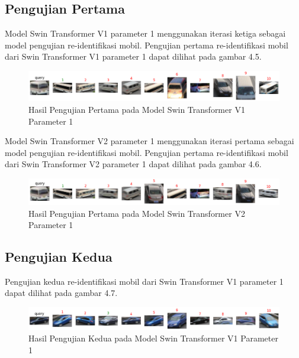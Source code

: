 \subsection{Pengujian Pertama}

Model Swin Transformer V1 parameter 1 menggunakan iterasi ketiga sebagai model pengujian re-identifikasi mobil. Pengujian pertama
re-identifikasi mobil dari Swin Transformer V1 parameter 1 dapat dilihat pada gambar 4.5.

\begin{figure}[ht]
  \centering
  \includegraphics[scale=0.6]{gambar/Que8V1P1IT3.png}
  \caption{Hasil Pengujian Pertama pada Model Swin Transformer V1 Parameter 1}
  \label{fig:hasilpengujianpertamapadamodelswintransformerv1param1}
\end{figure}

Model Swin Transformer V2 parameter 1 menggunakan iterasi pertama sebagai model pengujian re-identifikasi mobil. Pengujian pertama
re-identifikasi mobil dari Swin Transformer V2 parameter 1 dapat dilihat pada gambar 4.6.

\begin{figure}[ht]
  \centering
  \includegraphics[scale=0.6]{gambar/Que8V2P1IT1.png}
  \caption{Hasil Pengujian Pertama pada Model Swin Transformer V2 Parameter 1}
  \label{fig:hasilpengujianpertamapadamodelswintransformerv2param1}
\end{figure}

\subsection{Pengujian Kedua}

Pengujian kedua re-identifikasi mobil dari Swin Transformer V1 parameter 1 dapat dilihat pada gambar 4.7.

\begin{figure}[ht]
  \centering
  \includegraphics[scale=0.6]{gambar/qUE57v1P1IT3.png}
  \caption{Hasil Pengujian Kedua pada Model Swin Transformer V1 Parameter 1}
  \label{fig:hasilpengujiankeduapadamodelswintransformerv1param1}
\end{figure}


